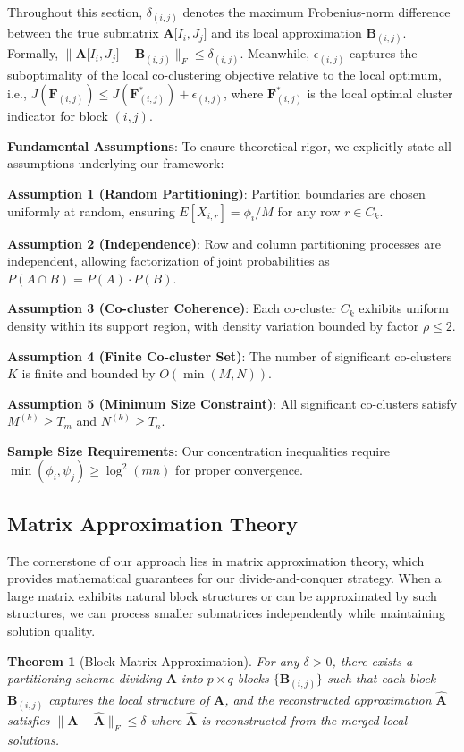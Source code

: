 \documentclass[journal]{IEEEtran}
\newtheorem{theorem}{Theorem}
\begin{document}
Throughout this section, $\delta_{(i,j)}$ denotes the maximum Frobenius-norm difference between the true submatrix $\mathbf{A}\lbrack I_i,J_j\rbrack $ and its local approximation $\mathbf{B}_{(i,j)}$. Formally, $\|\mathbf{A}\lbrack I_i, J_j\rbrack - \mathbf{B}_{(i,j)}\|_F \leq \delta_{(i,j)}$. Meanwhile, $\epsilon_{(i,j)}$ captures the suboptimality of the local co-clustering objective relative to the local optimum, i.e., $J(\mathbf{F}_{(i,j)}) \leq J(\mathbf{F}_{(i,j)}^*) + \epsilon_{(i,j)}$, where $\mathbf{F}_{(i,j)}^*$ is the local optimal cluster indicator for block $(i,j)$.

    {\color{blue}
        \textbf{Fundamental Assumptions}: To ensure theoretical rigor, we explicitly state all assumptions underlying our framework:

        \textbf{Assumption 1 (Random Partitioning)}: Partition boundaries are chosen uniformly at random, ensuring $E[X_{i,r}] = \phi_i/M$ for any row $r \in C_k$.

        \textbf{Assumption 2 (Independence)}: Row and column partitioning processes are independent, allowing factorization of joint probabilities as $P(A \cap B) = P(A) \cdot P(B)$.

        \textbf{Assumption 3 (Co-cluster Coherence)}: Each co-cluster $C_k$ exhibits uniform density within its support region, with density variation bounded by factor $\rho \leq 2$.

        \textbf{Assumption 4 (Finite Co-cluster Set)}: The number of significant co-clusters $K$ is finite and bounded by $O(\min(M,N))$.

        \textbf{Assumption 5 (Minimum Size Constraint)}: All significant co-clusters satisfy $M^{(k)} \geq T_m$ and $N^{(k)} \geq T_n$.

        \textbf{Sample Size Requirements}: Our concentration inequalities require $\min(\phi_i, \psi_j) \geq \log^2(mn)$ for proper convergence.
    }

\subsection{Matrix Approximation Theory}
The cornerstone of our approach lies in matrix approximation theory, which provides mathematical guarantees for our divide-and-conquer strategy. When a large matrix exhibits natural block structures or can be approximated by such structures, we can process smaller submatrices independently while maintaining solution quality.

\begin{theorem}[Block Matrix Approximation]
    \label{thm:block-matrix-approximation}
    For any $\delta > 0$, there exists a partitioning scheme dividing $\mathbf{A}$ into $p \times q$ blocks $\{\mathbf{B}_{(i,j)}\}$ such that each block $\mathbf{B}_{(i,j)}$ captures the local structure of $\mathbf{A}$, and the reconstructed approximation $\hat{\mathbf{A}}$ satisfies $\|\mathbf{A} - \hat{\mathbf{A}}\|_F \le \delta$ where $\hat{\mathbf{A}}$ is reconstructed from the merged local solutions.
\end{theorem}
\end{document}
